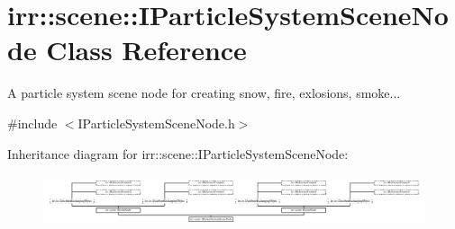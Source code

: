 \hypertarget{classirr_1_1scene_1_1IParticleSystemSceneNode}{}\section{irr\+:\+:scene\+:\+:I\+Particle\+System\+Scene\+Node Class Reference}
\label{classirr_1_1scene_1_1IParticleSystemSceneNode}


A particle system scene node for creating snow, fire, exlosions, smoke...  




{\ttfamily \#include $<$I\+Particle\+System\+Scene\+Node.\+h$>$}

Inheritance diagram for irr\+:\+:scene\+:\+:I\+Particle\+System\+Scene\+Node\+:\begin{figure}[H]
\begin{center}
\leavevmode
\includegraphics[height=1.515152cm]{classirr_1_1scene_1_1IParticleSystemSceneNode}
\end{center}
\end{figure}
